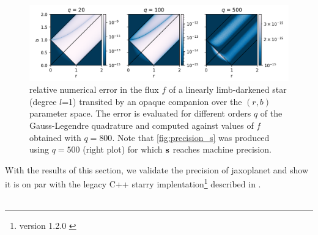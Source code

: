 \documentclass[modern]{aastex631}
\begin{document}
\begin{figure}[H]
    \begin{center}
        \includegraphics[width=\textwidth]{../workflows/figures/br_error.png}
        \caption{relative numerical error in the flux $f$ of a linearly limb-darkened star (degree $l$=1) transited by an opaque companion over the $(r, b)$ parameter space. The error is evaluated for different orders $q$ of the Gauss-Legendre quadrature and computed against values of $f$ obtained with $q=800$. Note that \autoref{fig:precision_s} was produced using $q=500$ (right plot) for which ${\mathbf{s}}$ reaches machine precision. }
        \label{fig:relative_error_1}
    \end{center}
\end{figure}

With the results of this section, we validate the precision of \textsf{jaxoplanet} and show it is on par with the legacy C++ \textsf{starry} implentation\footnote{version 1.2.0 \citep{starry_120}} described in \cite{starry}.\\\\
\end{document}

